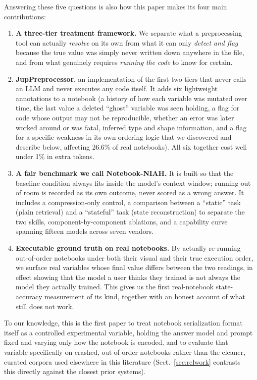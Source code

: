 \documentclass[11pt]{article}
\begin{document}
Answering these five questions is also how this paper makes its four
main contributions:
\begin{enumerate}
  \item \textbf{A three-tier treatment framework.} We separate what a
        preprocessing tool can actually \emph{resolve} on its own from
        what it can only \emph{detect and flag} because the true value
        was simply never written down anywhere in the file, and from what
        genuinely requires \emph{running the code} to know for certain.
  \item \textbf{JupPreprocessor}, an implementation of the first two
        tiers that never calls an LLM and never executes any code itself.
        It adds six lightweight annotations to a notebook (a history of
        how each variable was mutated over time, the last value a deleted
        ``ghost'' variable was seen holding, a flag for code whose output
        may not be reproducible, whether an error was later worked around
        or was fatal, inferred type and shape information, and a flag for
        a specific weakness in its own ordering logic that we discovered
        and describe below, affecting 26.6\% of real notebooks). All six
        together cost well under 1\% in extra tokens.
  \item \textbf{A fair benchmark we call Notebook-NIAH.} It is built so
        that the baseline condition always fits inside the model's
        context window; running out of room is recorded as its own
        outcome, never scored as a wrong answer. It includes a
        compression-only control, a comparison between a ``static'' task
        (plain retrieval) and a ``stateful'' task (state reconstruction) to
        separate the two skills, component-by-component ablations, and a
        capability curve spanning fifteen models across seven vendors.
  \item \textbf{Executable ground truth on real notebooks.} By actually
        re-running out-of-order notebooks under both their visual and
        their true execution order, we surface real variables whose final
        value differs between the two readings, in effect showing that
        the model a user thinks they trained is not always the model they
        actually trained. This gives us the first real-notebook
        state-accuracy measurement of its kind, together with an honest
        account of what still does not work.
\end{enumerate}
To our knowledge, this is the first paper to treat notebook serialization
format itself as a controlled experimental variable, holding the answer
model and prompt fixed and varying only how the notebook is encoded,
and to evaluate that variable specifically on crashed, out-of-order
notebooks rather than the cleaner, curated corpora used elsewhere in this
literature (Sect.~\ref{sec:relwork} contrasts this directly against the
closest prior systems).
\end{document}
